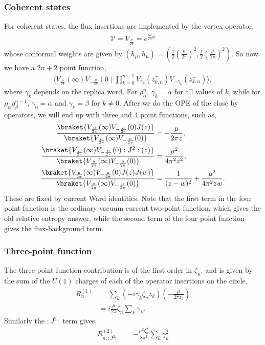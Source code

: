 \documentclass[11pt]{article}
\newcommand{\lb}{\left(}
\newcommand{\rb}{\right)}
\begin{document}
\subsubsection{Coherent states}
For coherent states, the flux insertions are implemented by the vertex operator,
\begin{align}
    \mathcal{V} = V_{\frac{\mu}{2\pi}} = e^{\frac{i\mu}{2\pi}\phi}
\end{align}
whose conformal weights are given by $(h_\mu,\bar h_\mu) = \lb \frac{1}{2}\lb\frac{\mu}{2\pi}\rb^2, \frac{1}{2}\lb\frac{\mu}{2\pi}\rb^2\rb$. So now we have a $2n+2$ point function,
\begin{align}
    \Big\langle V_{\frac{\mu}{2\pi}}(\infty)V_{-\frac{\mu}{2\pi}}(0) \prod_{k=0}^{n-1}V_{\gamma_k}(z_{k,n}^+)V_{-\gamma_k}(z_{k,n}^-)\Big\rangle,
\end{align}
where $\gamma_k$ depends on the replica word. For $\rho_\alpha^n$, $\gamma_k = \alpha$ for all values of $k$, while for $\rho_\alpha\rho_\beta^{n-1}$, $\gamma_0 = \alpha$ and $\gamma_k = \beta$ for $k\neq 0$. After we do the OPE of the close by operators, we will end up with three and 4 point functions, such as,
\begin{align}
    \frac{\braket{V_{\frac{\mu}{2\pi}}(\infty)V_{-\frac{\mu}{2\pi}}(0)J(z)}}{\braket{V_{\frac{\mu}{2\pi}}(\infty)V_{-\frac{\mu}{2\pi}}(0)}} &= -\frac{\mu}{2\pi z},
    \\
    \frac{\braket{V_{\frac{\mu}{2\pi}}(\infty)V_{-\frac{\mu}{2\pi}}(0):J^2:(z)}}{\braket{V_{\frac{\mu}{2\pi}}(\infty)V_{-\frac{\mu}{2\pi}}(0)}} &= \frac{\mu^2}{4\pi^2 z^2},\\
    \frac{\braket{V_{\frac{\mu}{2\pi}}(\infty)V_{-\frac{\mu}{2\pi}}(0)J(z)J(w)}}{\braket{V_{\frac{\mu}{2\pi}}(\infty)V_{-\frac{\mu}{2\pi}}(0)}} &= \frac{1}{(z-w)^2}+\frac{\mu^2}{4\pi^2 zw}.
\end{align}
These are fixed by current Ward identities. 
Note that the first term in the four point function is the ordinary vacuum current two-point function, which gives the old relative entropy answer, while the second term of the four point function gives the flux-background term.
\subsubsection{Three-point function}
The three-point function contribution is of the first order in $\zeta_n$, and is given by the sum of the $U(1)$ charges of each of the operator insertions on the circle,
\begin{align}
    R_n^{(1)} &= \sum_k (-i \gamma_k \zeta_nz_k )\lb -\frac{\mu}{2\pi z_k}\rb \\
    &= i \frac{\mu}{2\pi}\zeta_n \sum_k\gamma_k.
\end{align}
Similarly the $:J^2:$ term gives,
\begin{align}
    R_{n,:J^2:}^{(2)} &= -\frac{\mu^2\zeta_n^2} {8\pi^2}\sum_k\gamma_k^2
\end{align}
\end{document}
